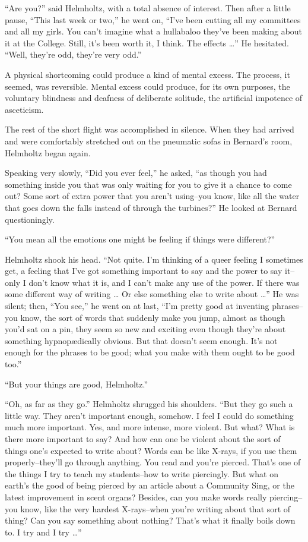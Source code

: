 \documentclass[12pt]{report}
\begin{document}
``Are you?'' said Helmholtz, with a total absence of interest. Then
after a little pause, ``This last week or two,'' he went on, ``I've been
cutting all my committees and all my girls. You can't imagine what a
hullabaloo they've been making about it at the College. Still, it's been
worth it, I think. The effects \ldots{}'' He hesitated. ``Well, they're
odd, they're very odd.''

A physical shortcoming could produce a kind of mental excess. The
process, it seemed, was reversible. Mental excess could produce, for its
own purposes, the voluntary blindness and deafness of deliberate
solitude, the artificial impotence of asceticism.

The rest of the short flight was accomplished in silence. When they had
arrived and were comfortably stretched out on the pneumatic sofas in
Bernard's room, Helmholtz began again.

Speaking very slowly, ``Did you ever feel,'' he asked, ``as though you
had something inside you that was only waiting for you to give it a
chance to come out? Some sort of extra power that you aren't using--you
know, like all the water that goes down the falls instead of through the
turbines?'' He looked at Bernard questioningly.

``You mean all the emotions one might be feeling if things were
different?''

Helmholtz shook his head. ``Not quite. I'm thinking of a queer feeling I
sometimes get, a feeling that I've got something important to say and
the power to say it--only I don't know what it is, and I can't make any
use of the power. If there was some different way of writing \ldots{} Or
else something else to write about \ldots{}'' He was silent; then, ``You
see,'' he went on at last, ``I'm pretty good at inventing phrases--you
know, the sort of words that suddenly make you jump, almost as though
you'd sat on a pin, they seem so new and exciting even though they're
about something hypnopædically obvious. But that doesn't seem enough.
It's not enough for the phrases to be good; what you make with them
ought to be good too.''

``But your things are good, Helmholtz.''

``Oh, as far as they go.'' Helmholtz shrugged his shoulders. ``But they
go such a little way. They aren't important enough, somehow. I feel I
could do something much more important. Yes, and more intense, more
violent. But what? What is there more important to say? And how can one
be violent about the sort of things one's expected to write about? Words
can be like X-rays, if you use them properly--they'll go through
anything. You read and you're pierced. That's one of the things I try to
teach my students--how to write piercingly. But what on earth's the good
of being pierced by an article about a Community Sing, or the latest
improvement in scent organs? Besides, can you make words really
piercing--you know, like the very hardest X-rays--when you're writing
about that sort of thing? Can you say something about nothing? That's
what it finally boils down to. I try and I try \ldots{}''
\end{document}
